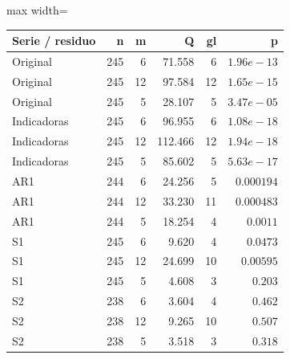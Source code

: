 \begin{center}\small\setlength{\tabcolsep}{4pt}
\begin{adjustbox}{max width=\textwidth}\begin{tabular}{lrrrrr}
\toprule
Serie / residuo & n & m & Q & gl & p \\ \midrule
Original & 245 & 6 & 71.558 & 6 & $1.96e-13$ \\
Original & 245 & 12 & 97.584 & 12 & $1.65e-15$ \\
Original & 245 & 5 & 28.107 & 5 & $3.47e-05$ \\
Indicadoras & 245 & 6 & 96.955 & 6 & $1.08e-18$ \\
Indicadoras & 245 & 12 & 112.466 & 12 & $1.94e-18$ \\
Indicadoras & 245 & 5 & 85.602 & 5 & $5.63e-17$ \\
AR1 & 244 & 6 & 24.256 & 5 & $0.000194$ \\
AR1 & 244 & 12 & 33.230 & 11 & $0.000483$ \\
AR1 & 244 & 5 & 18.254 & 4 & $0.0011$ \\
S1 & 245 & 6 & 9.620 & 4 & $0.0473$ \\
S1 & 245 & 12 & 24.699 & 10 & $0.00595$ \\
S1 & 245 & 5 & 4.608 & 3 & $0.203$ \\
S2 & 238 & 6 & 3.604 & 4 & $0.462$ \\
S2 & 238 & 12 & 9.265 & 10 & $0.507$ \\
S2 & 238 & 5 & 3.518 & 3 & $0.318$ \\
\bottomrule\end{tabular}\end{adjustbox}\end{center}
